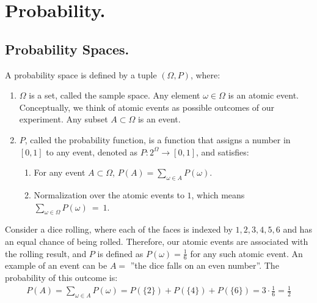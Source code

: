 


\ifdefined\BOOK
\else
\setcounter{chapter}{6}
\fi
\chapter{Probability.} 

\section{ Probability Spaces. }

\begin{definition}
  A probability space is defined by a tuple $(\Omega,P)$, where:
  \begin{enumerate} 
    \item $\Omega$ is a set, called the sample space. Any element $\omega\in \Omega$ is an atomic event. Conceptually, we think of atomic events as possible outcomes of our experiment. Any subset $A \subset \Omega$ is an event. 
    \item $P$, called the probability function, is a function that assigns a number in $[0,1]$ to any event, denoted as $P : 2^\Omega \rightarrow [0,1]$, and satisfies:
      \begin{enumerate}
        \item For any event $A \subset \Omega$, $P(A) = \sum_{\omega\in A}P(\omega)$. 
        \item Normalization over the atomic events to $1$, which means $\sum_{\omega\in\Omega}P(\omega)~=~1$.
      \end{enumerate}
  \end{enumerate}
\end{definition}
\begin{example}
  Consider a dice rolling, where each of the faces is indexed by $1,2,3,4,5,6$ and has an equal chance of being rolled. Therefore, our atomic events are associated with the rolling result, and $P$ is defined as $P(\omega) = \frac{1}{6}$ for any such atomic event.
  An example of an event can be $A=$ ''the dice falls on an even number''. The probability of this outcome is:
  \begin{equation*}
    \begin{split}
      P(A)= \sum_{\omega\in A}{ P(\omega) } = P(\{2\}) + P(\{4\}) + P(\{6\}) = 3\cdot \frac{1}{6} = \frac{1}{2} 
    \end{split}
  \end{equation*}
\end{example}

